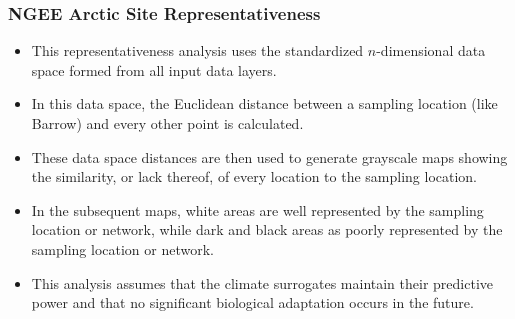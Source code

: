 \begin{frame}
 \frametitle{NGEE Arctic Site Representativeness}
 \begin{itemize}
  \item This representativeness analysis uses the standardized
$n$-dimensional data space formed from all input data layers.
  \item In this data space, the Euclidean distance between a sampling
location (like Barrow) and every other point is calculated.
  \item These data space distances are then used to generate
grayscale maps showing the similarity, or lack thereof, of every
location to the sampling location.
  \item In the subsequent maps, white areas are well represented by
the sampling location or network, while dark and black areas
as poorly represented by the sampling location or network.
  \item This analysis assumes that the climate surrogates maintain
their predictive power and that no significant biological
adaptation occurs in the future.
 \end{itemize}
\end{frame}

